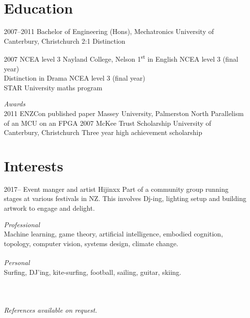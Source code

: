 \documentclass[print]{friggeri-cv} %
\begin{document}
\section{Education}
\begin{entrylist}
\entry
{2007--2011}
{Bachelor of Engineering (Hons), Mechatronics}
{University of Canterbury, Christchurch}
{2:1 Distinction}

\entry
{2007}
{NCEA level 3}
{Nayland College, Nelson}
{1\textsuperscript{st} in English NCEA level 3 (final year)\\
Distinction in Drama NCEA level 3 (final year)\\
STAR University maths program}

\emph{Awards}\\
\entry
{2011}
{ENZCon published paper}
{Massey University, Palmerston North}
{Parallelism of an MCU on an FPGA}
\entry
{2007}
{McKee Trust Scholarship}
{University of Canterbury, Christchurch}
{Three year high achievement scholarship}
\end{entrylist}

\section{Interests}
\begin{entrylist}
\entry 
{2017-- }
{Event manger and artist}
{Hijinxx}
{Part of a community group running stages at various festivals in NZ. This involves Dj-ing, lighting setup and building artwork to engage and delight.}
\end{entrylist}

\emph{Professional}\\ Machine learning, game theory, artificial intelligence, embodied cognition, topology, computer vision, systems design, climate change.\\
\\
\emph{Personal}\\ Surfing, DJ'ing, kite-surfing, football, sailing, guitar, skiing.
\\ \\ \\ \\
\emph{References available on request.}
\end{document}
